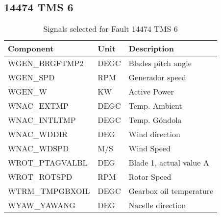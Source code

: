 \subsection{14474 TMS 6}

\begin{table}[!ht]
    \centering
    \begin{tabular}{|l|l|l|}
    \hline
        Component & Unit & Description \\ \hline
        WGEN\_BRGFTMP2 & DEGC & Blades pitch angle \\ \hline
        WGEN\_SPD & RPM & Generador speed \\ \hline
        WGEN\_W & KW & Active Power \\ \hline
        WNAC\_EXTMP & DEGC & Temp. Ambient \\ \hline
        WNAC\_INTLTMP & DEGC & Temp. Góndola \\ \hline
        WNAC\_WDDIR & DEG & Wind direction \\ \hline
        WNAC\_WDSPD & M/S & Wind Speed \\ \hline
        WROT\_PTAGVALBL & DEG & Blade 1, actual value A \\ \hline
        WROT\_ROTSPD & RPM & Rotor Speed \\ \hline
        WTRM\_TMPGBXOIL & DEGC & Gearbox oil temperature \\ \hline
        WYAW\_YAWANG & DEG & Nacelle direction \\ \hline
    \end{tabular}
    \caption{Signals selected for Fault 14474 TMS 6}
\end{table}

